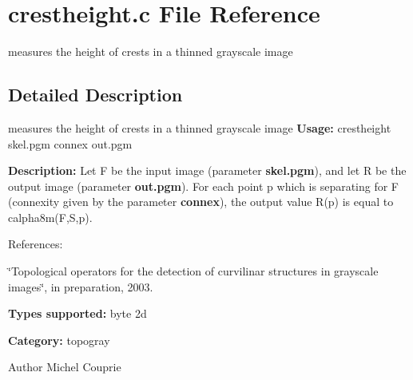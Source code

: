 \section{crestheight.c File Reference}
\label{crestheight_8c}


measures the height of crests in a thinned grayscale image  




\subsection{Detailed Description}
measures the height of crests in a thinned grayscale image {\bfseries Usage:} crestheight skel.pgm connex out.pgm

{\bfseries Description:} Let F be the input image (parameter {\bfseries skel.pgm}), and let R be the output image (parameter {\bfseries out.pgm}). For each point p which is separating for F (connexity given by the parameter {\bfseries connex}), the output value R(p) is equal to calpha8m(F,S,p).

References:\par
 \char`\"{}Topological operators for the detection of
curvilinar structures in grayscale images\char`\"{}, in preparation, 2003.

{\bfseries Types supported:} byte 2d

{\bfseries Category:} topogray

\begin{DoxyAuthor}{Author}
Michel Couprie 
\end{DoxyAuthor}
